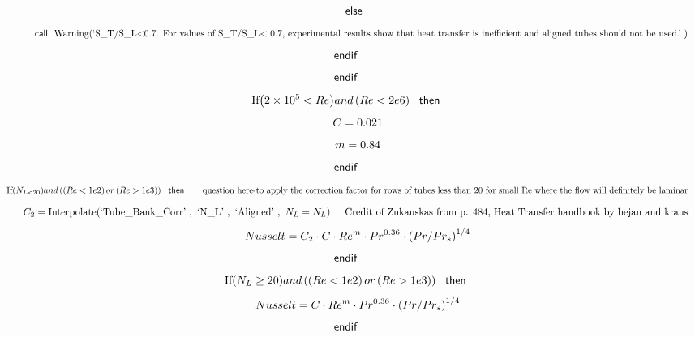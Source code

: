 \documentclass[10pt,fleqn]{article}
\newcommand{\K}[1]{\mbox{\sf#1\ \ \mit}}
\newcommand{\KS}[1]{\mbox{\sf\ \ #1\ \ \mit}}
\newcommand{\SC}[1]{\mbox{`#1'}\  }
\newcommand{\V}[1]{\mbox{$ #1 $}}
\newcommand{\I}{\mbox{\hspace{0.20in}}}
\begin{document}
\begin{equation}
\I \I \label{EES Eqn:205}
\K{else} 
\end{equation}
\begin{equation}
\I \I \I \label{EES Eqn:206}
\K{call} \mbox{Warning}{ \left( \SC{S\_T/S\_L<0.7. For values of S\_T/S\_L< 0.7, experimental results show that heat transfer is inefficient and aligned tubes should not be used.} \right) } 
\end{equation}
\begin{equation}
\I \label{EES Eqn:207}
\K{endif} 
\end{equation}
\begin{equation}
\I \label{EES Eqn:208}
\K{endif} 
\end{equation}
\begin{equation}
\I \label{EES Eqn:209}
\mbox{If}{ \left( 2\times 10^{5}<\V{Re}  \right) } \V{and}   \left( \V{Re<2e6}  \right)  \KS{then} 
\end{equation}
\begin{equation}
\I \I \label{EES Eqn:210}
C=0.021 
\end{equation}
\begin{equation}
\I \I \label{EES Eqn:211}
m=0.84 
\end{equation}
\begin{equation}
\I \label{EES Eqn:212}
\K{endif} 
\end{equation}
\begin{equation}
\I \label{EES Eqn:213}
\mbox{If}{ \left( N_{L<20} \right) } \V{and}   \left(  \left( \V{Re<1e2}  \right)  \V{or}   \left( \V{Re>1e3}  \right)  \right)  \KS{then}	 
\mbox{\I question here-to apply the correction factor for rows of tubes less than 20 for small Re where the flow will definitely be laminar}
\end{equation}
\begin{equation}
\I \I \label{EES Eqn:214}
C_{2}=\mbox{Interpolate}{ \left( \SC{Tube\_Bank\_Corr},\ \SC{N\_L},\ \SC{Aligned},\ N_{L}=N_{L} \right) }	 
\mbox{\I Credit of Zukauskas from p. 484, Heat Transfer handbook by bejan and kraus}
\end{equation}
\begin{equation}
\I \I \label{EES Eqn:215}
\V{Nusselt} =C_{2}\cdot C\cdot \V{Re} ^{m}\cdot \V{Pr} ^{0.36}\cdot  \left( \V{Pr}/Pr_{s} \right) ^{1/4} 
\end{equation}
\begin{equation}
\I \label{EES Eqn:216}
\K{endif} 
\end{equation}
\begin{equation}
\I \label{EES Eqn:217}
\mbox{If}{ \left( N_{L}\geq 20 \right) } \V{and}   \left(  \left( \V{Re<1e2}  \right)  \V{or}   \left( \V{Re>1e3}  \right)  \right)  \KS{then} 
\end{equation}
\begin{equation}
\I \I \label{EES Eqn:218}
\V{Nusselt} =C\cdot \V{Re} ^{m}\cdot \V{Pr} ^{0.36}\cdot  \left( \V{Pr}/Pr_{s} \right) ^{1/4} 
\end{equation}
\begin{equation}
\I \label{EES Eqn:219}
\K{endif} 
\end{equation}
\end{document}
